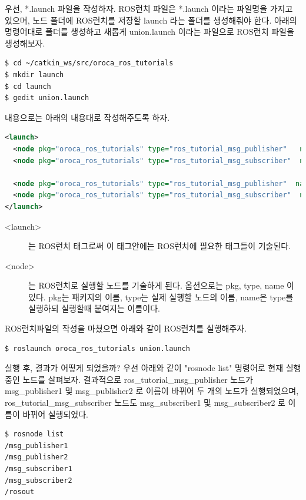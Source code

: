 우선, *.launch 파일을 작성하자. ROS런치 파일은 *.launch 이라는 파일명을 가지고 있으며, 노드 폴더에 ROS런치를 저장할 launch 라는 폴더를 생성해줘야 한다. 아래의 명령어대로 폴더를 생성하고 새롭게 union.launch 이라는 파일으로 ROS런치 파일을 생성해보자.

\vspace{\baselineskip}
\begin{lstlisting}[language=ROS]
$ cd ~/catkin_ws/src/oroca_ros_tutorials
$ mkdir launch
$ cd launch
$ gedit union.launch
\end{lstlisting}

\noindent
내용으로는 아래의 내용대로 작성해주도록 하자.

\begin{lstlisting}[language=XML]
<launch>
  <node pkg="oroca_ros_tutorials" type="ros_tutorial_msg_publisher"   name="msg_publisher1"/>
  <node pkg="oroca_ros_tutorials" type="ros_tutorial_msg_subscriber"  name="msg_subscriber1"/>

  <node pkg="oroca_ros_tutorials" type="ros_tutorial_msg_publisher"  name="msg_publisher2"/>
  <node pkg="oroca_ros_tutorials" type="ros_tutorial_msg_subscriber"  name="msg_subscriber2"/>
</launch>
\end{lstlisting}

\begin{description}
\item[\textless launch\textgreater] 는 ROS런치 태그로써 이 태그안에는 ROS런치에 필요한 태그들이 기술된다.
\item[\textless node\textgreater] 는 ROS런치로 실행할 노드를 기술하게 된다. 옵션으로는 pkg, type, name 이 있다. pkg는 패키지의 이름, type는 실제 실행할 노드의 이름, name은 type를 실행하되 실행할때 붙여지는 이름이다.  
\end{description}

ROS런치파일의 작성을 마쳤으면 아래와 같이 ROS런치를 실행해주자.

\begin{lstlisting}[language=ROS]
$ roslaunch oroca_ros_tutorials union.launch
\end{lstlisting}

\noindent
실행 후, 결과가 어떻게 되었을까? 우선 아래와 같이 "rosnode list" 명령어로 현재 실행중인 노드를 살펴보자. 결과적으로  ros\_tutorial\_msg\_publisher 노드가 msg\_publisher1 및 msg\_publisher2 로 이름이 바뀌어 두 개의 노드가 실행되었으며, ros\_tutorial\_msg\_subscriber 노드도  msg\_subscriber1 및 msg\_subscriber2 로 이름이 바뀌어 실행되었다.  

\vspace{\baselineskip}
\begin{lstlisting}[language=ROS]
$ rosnode list
/msg_publisher1
/msg_publisher2
/msg_subscriber1
/msg_subscriber2
/rosout
\end{lstlisting}

